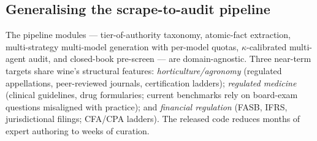 \subsection{Generalising the scrape-to-audit pipeline}
The pipeline modules --- tier-of-authority taxonomy, atomic-fact
extraction, multi-strategy multi-model generation with per-model
quotas, $\kappa$-calibrated multi-agent audit, and closed-book
pre-screen --- are domain-agnostic. Three near-term targets share
wine's structural features: \emph{horticulture/agronomy} (regulated
appellations, peer-reviewed journals, certification ladders);
\emph{regulated medicine} (clinical guidelines, drug formularies;
current benchmarks rely on board-exam questions misaligned with
practice); and \emph{financial regulation} (FASB, IFRS, jurisdictional
filings; CFA/CPA ladders). The released code reduces months of
expert authoring to weeks of curation.
